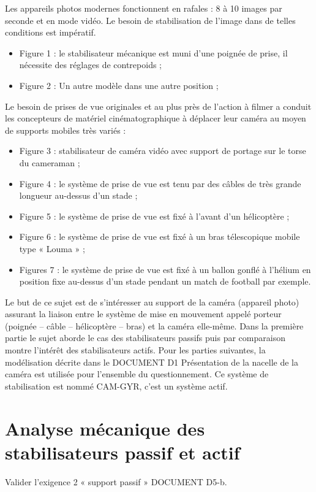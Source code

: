 \documentclass[10pt,fleqn]{article} %
\begin{document}
Les appareils photos modernes fonctionnent en rafales : 8 à 10 images par seconde et en mode vidéo. Le besoin de stabilisation de l’image dans de telles conditions est impératif.

\begin{itemize}
\item Figure 1 : le stabilisateur mécanique est muni d’une poignée de prise, il nécessite des réglages de contrepoids ;
\item Figure 2 : Un autre modèle dans une autre position ;
\end{itemize}
Le besoin de prises de vue originales et au plus près de l’action à filmer a conduit les concepteurs de matériel cinématographique à déplacer leur caméra au moyen de supports mobiles très variés :
\begin{itemize}
\item Figure 3 : stabilisateur de caméra vidéo avec support de portage sur le torse du cameraman ;
\item Figure 4 : le système de prise de vue est tenu par des câbles de très grande longueur au-dessus d’un stade ;
\item Figure 5 : le système de prise de vue est fixé à l’avant d’un hélicoptère ;
\item Figure 6 : le système de prise de vue est fixé à un bras télescopique mobile type « Louma » ;
\item Figures 7 : le système de prise de vue est fixé à un ballon gonflé à l’hélium en position fixe au-dessus d’un stade pendant un match de football par exemple. 
\end{itemize}
Le but de ce sujet est de s’intéresser au support de la caméra (appareil photo) assurant la liaison entre le système de mise en mouvement appelé porteur (poignée -- câble -- hélicoptère -- bras) et la caméra elle-même. 
Dans la première partie le sujet aborde le cas des stabilisateurs passifs puis par comparaison montre l’intérêt des stabilisateurs actifs.
Pour les parties suivantes, la modélisation décrite dans le DOCUMENT D1 Présentation de la nacelle de la caméra est utilisée pour l’ensemble du questionnement. Ce système de stabilisation est nommé CAM-GYR, c’est un système actif.


\section{Analyse mécanique des stabilisateurs passif et actif}

\begin{obj}
Valider l’exigence 2 « support passif »  DOCUMENT D5-b.
\end{obj}
\end{document}
